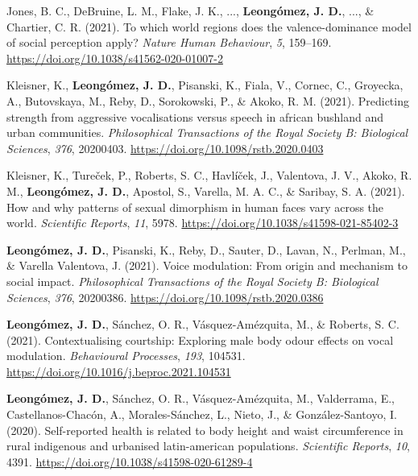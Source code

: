 \documentclass[11pt,a4paper,]{awesome-cv}
\begin{document}
\leavevmode{}%
Jones, B. C., DeBruine, L. M., Flake, J. K., ...,
\textbf{Leongómez, J. D.}, ..., \& Chartier, C. R. (2021). {To which
world regions does the valence-dominance model of social perception
apply?} \emph{Nature Human Behaviour}, \emph{5}, 159--169.
\url{https://doi.org/10.1038/s41562-020-01007-2}

\leavevmode{}%
Kleisner, K., \textbf{Leongómez, J. D.}, Pisanski, K., Fiala, V.,
Cornec, C., Groyecka, A., Butovskaya, M., Reby, D., Sorokowski, P., \&
Akoko, R. M. (2021). Predicting strength from aggressive vocalisations
versus speech in african bushland and urban communities.
\emph{Philosophical Transactions of the Royal Society B: Biological
Sciences}, \emph{376}, 20200403.
\url{https://doi.org/10.1098/rstb.2020.0403}

\leavevmode{}%
Kleisner, K., Tureček, P., Roberts, S. C., Havlíček, J., Valentova, J.
V., Akoko, R. M., \textbf{Leongómez, J. D.}, Apostol, S., Varella, M. A.
C., \& Saribay, S. A. (2021). How and why patterns of sexual dimorphism
in human faces vary across the world. \emph{Scientific Reports},
\emph{11}, 5978. \url{https://doi.org/10.1038/s41598-021-85402-3}

\leavevmode{}%
\textbf{Leongómez, J. D.}, Pisanski, K., Reby, D., Sauter, D., Lavan,
N., Perlman, M., \& Varella Valentova, J. (2021). Voice modulation:
{From} origin and mechanism to social impact. \emph{Philosophical
Transactions of the Royal Society B: Biological Sciences}, \emph{376},
20200386. \url{https://doi.org/10.1098/rstb.2020.0386}

\leavevmode{}%
\textbf{Leongómez, J. D.}, Sánchez, O. R., Vásquez-Amézquita, M., \&
Roberts, S. C. (2021). Contextualising courtship: Exploring male body
odour effects on vocal modulation. \emph{Behavioural Processes},
\emph{193}, 104531. \url{https://doi.org/10.1016/j.beproc.2021.104531}

\leavevmode{}%
\textbf{Leongómez, J. D.}, Sánchez, O. R., Vásquez-Amézquita, M.,
Valderrama, E., Castellanos-Chacón, A., Morales-Sánchez, L., Nieto, J.,
\& González-Santoyo, I. (2020). Self-reported health is related to body
height and waist circumference in rural indigenous and urbanised
latin-american populations. \emph{Scientific Reports}, \emph{10}, 4391.
\url{https://doi.org/10.1038/s41598-020-61289-4}
\end{document}
